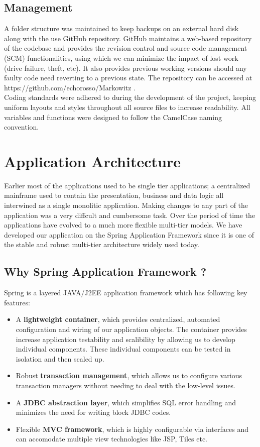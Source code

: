 \subsection{Management}
A folder structure was maintained to keep backups on an external hard disk along with the use GitHub repository. GitHub maintains a web-based repository of the codebase and provides the revision control and source code management (SCM) functionalities, using which we can minimize the impact of lost work (drive failure, theft, etc). It also provides previous working versions should any faulty code need reverting to a previous state. The repository can be accessed at https://github.com/echorosso/Markowitz .\\
Coding standards were adhered to during the development of the project, keeping uniform layouts and styles throughout all source files to increase readability. All variables and functions were designed to follow the CamelCase naming convention.\\

\section{Application Architecture}
Earlier most of the applications used to be single tier applications; a centralized mainframe used to contain the presentation, business and data logic all interwined as a single monolitic application. Making changes to any part of the application was a very diffcult and cumbersome task. Over the period of time the applications have evolved to a much more flexible multi-tier models. We have developed our application on the Spring Application Framework since it is one of the stable and robust multi-tier architecture widely used today. 
\subsection{Why Spring Application Framework ?}
Spring is a layered JAVA/J2EE application framework which has following key features:
\begin{itemize}
\item A \textbf{lightweight container}, which provides centralized, automated configuration and wiring of our application objects. The container provides increase application testability and scalibility by allowing us to develop individual components. These individual components can be tested in isolation and then scaled up.
\item Robust \textbf{transaction management}, which allows us to configure various transaction managers without needing to deal with the low-level issues.
\item A \textbf{JDBC abstraction layer}, which simplifies SQL error handling and minimizes the need for writing block JDBC codes.
\item Flexible \textbf{MVC framework}, which is highly configurable via interfaces and can accomodate multiple view technologies like JSP, Tiles etc.
\end{itemize}

